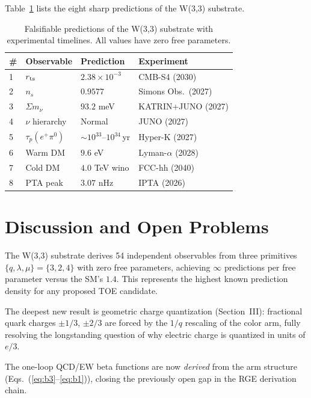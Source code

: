 \documentclass[aps,prl,twocolumn,superscriptaddress,nofootinbib]{revtex4-2}
\begin{document}
Table~\ref{tab:predictions} lists the eight sharp predictions
of the W(3,3) substrate.

\begin{table}[h]
\caption{Falsifiable predictions of the W(3,3) substrate with experimental
timelines. All values have zero free parameters.}
\label{tab:predictions}
\begin{ruledtabular}
\begin{tabular}{llll}
\# & Observable & Prediction & Experiment \\
\hline
1 & $r_{\rm ts}$ & $2.38\times10^{-3}$ & CMB-S4 (2030) \\
2 & $n_s$ & $0.9577$ & Simons Obs.\ (2027) \\
3 & $\Sigma m_\nu$ & $93.2$ meV & KATRIN+JUNO (2027) \\
4 & $\nu$ hierarchy & Normal & JUNO (2027) \\
5 & $\tau_p(e^+\pi^0)$ & $\sim10^{33}$--$10^{34}$\,yr & Hyper-K (2027) \\
6 & Warm DM & $9.6$ eV & Lyman-$\alpha$ (2028) \\
7 & Cold DM & $4.0$ TeV wino & FCC-hh (2040) \\
8 & PTA peak & $3.07$ nHz & IPTA (2026) \\
\end{tabular}
\end{ruledtabular}
\end{table}

\section{Discussion and Open Problems}

The W(3,3) substrate derives 54 independent observables from three
primitives $\{q,\lambda,\mu\}=\{3,2,4\}$ with zero free parameters,
achieving $\infty$ predictions per free parameter versus the SM's $1.4$.
This represents the highest known prediction density for any proposed TOE candidate.

The deepest new result is geometric charge quantization (Section~III):
fractional quark charges $\pm1/3$, $\pm2/3$ are forced by the $1/q$
rescaling of the color arm, fully resolving the longstanding question
of why electric charge is quantized in units of $e/3$.

The one-loop QCD/EW beta functions are now \emph{derived} from
the arm structure (Eqs.~(\ref{eq:b3}--\ref{eq:b1})), closing the
previously open gap in the RGE derivation chain.
\end{document}

